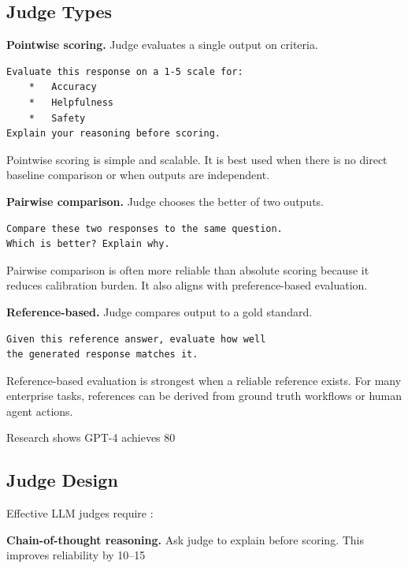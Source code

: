 \subsection{Judge Types}

\textbf{Pointwise scoring.} Judge evaluates a single output on criteria.
\begin{verbatim}
Evaluate this response on a 1-5 scale for:
	*	Accuracy
	*	Helpfulness
	*	Safety
Explain your reasoning before scoring.
\end{verbatim}

Pointwise scoring is simple and scalable. It is best used when there is no direct baseline comparison or when outputs are independent.

\textbf{Pairwise comparison.} Judge chooses the better of two outputs.
\begin{verbatim}
Compare these two responses to the same question.
Which is better? Explain why.
\end{verbatim}

Pairwise comparison is often more reliable than absolute scoring because it reduces calibration burden. It also aligns with preference-based evaluation.

\textbf{Reference-based.} Judge compares output to a gold standard.
\begin{verbatim}
Given this reference answer, evaluate how well
the generated response matches it.
\end{verbatim}

Reference-based evaluation is strongest when a reliable reference exists. For many enterprise tasks, references can be derived from ground truth workflows or human agent actions.

Research shows GPT-4 achieves 80%

\subsection{Judge Design}

Effective LLM judges require \cite{llmasjudge2025}:

\textbf{Chain-of-thought reasoning.} Ask judge to explain before scoring. This improves reliability by 10–15%


